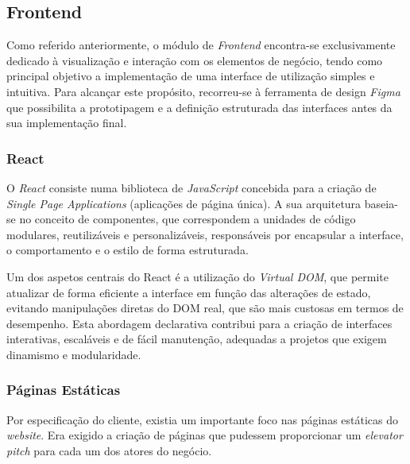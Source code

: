 \subsection{Frontend}

Como referido anteriormente, o módulo de \textit{Frontend} encontra-se exclusivamente dedicado à visualização e interação com os elementos de negócio, tendo como principal objetivo a implementação de uma interface de utilização simples e intuitiva. Para alcançar este propósito, recorreu-se à ferramenta de design  \textit{Figma} que possibilita a prototipagem e a definição estruturada das interfaces antes da sua implementação final.

\subsubsection{React}

O \textit{React} consiste numa biblioteca de \textit{JavaScript} concebida para a criação de \textit{Single Page Applications} (aplicações de página única). A sua arquitetura baseia-se no conceito de componentes, que correspondem a unidades de código modulares, reutilizáveis e personalizáveis, responsáveis por encapsular a interface, o comportamento e o estilo de forma estruturada.

Um dos aspetos centrais do React é a utilização do \textit{Virtual DOM}, que permite atualizar de forma eficiente a interface em função das alterações de estado, evitando manipulações diretas do DOM real, que são mais custosas em termos de desempenho. Esta abordagem declarativa contribui para a criação de interfaces interativas, escaláveis e de fácil manutenção, adequadas a projetos que exigem dinamismo e modularidade.


\subsubsection{Páginas Estáticas}

Por especificação do cliente, existia um importante foco nas páginas estáticas do \textit{website}. Era exigido a criação de páginas que pudessem proporcionar um \textit{elevator pitch} para cada um dos atores do negócio.

